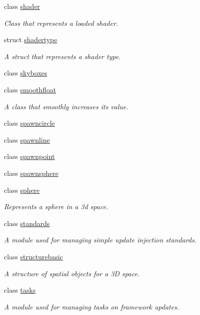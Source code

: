 \begin{DoxyCompactItemize}
class \hyperlink{classflounder_1_1shader}{shader}
\begin{DoxyCompactList}\small\item\em Class that represents a loaded shader. \end{DoxyCompactList}\item 
struct \hyperlink{structflounder_1_1shadertype}{shadertype}
\begin{DoxyCompactList}\small\item\em A struct that represents a shader type. \end{DoxyCompactList}\item 
class \hyperlink{classflounder_1_1skyboxes}{skyboxes}
\item 
class \hyperlink{classflounder_1_1smoothfloat}{smoothfloat}
\begin{DoxyCompactList}\small\item\em A class that smoothly increases its value. \end{DoxyCompactList}\item 
class \hyperlink{classflounder_1_1spawncircle}{spawncircle}
\item 
class \hyperlink{classflounder_1_1spawnline}{spawnline}
\item 
class \hyperlink{classflounder_1_1spawnpoint}{spawnpoint}
\item 
class \hyperlink{classflounder_1_1spawnsphere}{spawnsphere}
\item 
class \hyperlink{classflounder_1_1sphere}{sphere}
\begin{DoxyCompactList}\small\item\em Represents a sphere in a 3d space. \end{DoxyCompactList}\item 
class \hyperlink{classflounder_1_1standards}{standards}
\begin{DoxyCompactList}\small\item\em A module used for managing simple update injection standards. \end{DoxyCompactList}\item 
class \hyperlink{classflounder_1_1structurebasic}{structurebasic}
\begin{DoxyCompactList}\small\item\em A structure of spatial objects for a 3D space. \end{DoxyCompactList}\item 
class \hyperlink{classflounder_1_1tasks}{tasks}
\begin{DoxyCompactList}\small\item\em A module used for managing tasks on framework updates. \end{DoxyCompactList}\item 

\end{DoxyCompactItemize}
